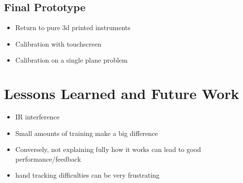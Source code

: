 \subsection{Final Prototype}

\begin{itemize}
    \item Return to pure 3d printed instruments
    \item Calibration with touchscreen
    \item Calibration on a single plane problem
\end{itemize}

\section{Lessons Learned and Future Work}

\begin{itemize}
    \item IR interference
    \item Small amounts of training make a big difference
    \item Conversely, not explaining fully how it works can lead to good performance/feedback
    \item hand tracking difficulties can be very frustrating
\end{itemize}
